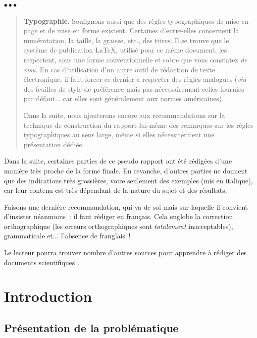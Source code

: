 \documentclass[11pt, french, screen, research-development]{report-rd-info}
\newenvironment{typographie}{\begin{quote}\textbf{Typographie}. }{\end{quote}}
\newenvironment{explanation}
{\color{blue}
 \begin{list}{}{\hspace{0.2\textwidth}\color{blue}}\item $\bullet\bullet\bullet$
}
{\end{list}}
\begin{document}
\begin{explanation}
   \begin{typographie}
   Soulignons aussi que des règles typographiques de mise en page et de mise en forme existent.
   Certaines d'entre-elles concernent la numérotation, la taille, la graisse, etc., des titres.
   Il se trouve que le système de publication \LaTeX, utilisé pour ce même document, les respectent, sous une forme conventionnelle et sobre que vous constatez \emph{de visu}.
   En cas d'utilisation d'un autre outil de rédaction de texte électronique, il faut forcer ce dernier à respecter des règles analogues (\emph{via} des feuilles de style de préférence mais pas nécessairement celles fournies par défaut...
   car elles sont généralement aux normes américaines).

   Dans la suite, nous ajouterons encore aux recommandations sur la technique de construction du rapport lui-même des remarques sur les règles typographiques au sens large, même si elles nécessiteraient une présentation dédiée.
   \end{typographie}

   \bigskip

   Dans la suite, certaines parties de ce pseudo rapport ont été rédigées d'une manière très proche de la forme finale.
   En revanche, d'autres parties ne donnent que des indications très grossières, voire seulement des exemples (mis en italique), car leur contenu est très dépendant de la nature du sujet et des résultats.

   \bigskip

   Faisons une dernière recommandation, qui va de soi mais sur laquelle il convient d'insister néanmoins~: il faut rédiger en français.
   Cela englobe la correction orthographique (les erreurs orthographiques sont \emph{totalement} inacceptables), grammaticale et... l'absence de franglais~!

   \bigskip

   Le lecteur pourra trouver nombre d'autres sources pour apprendre à rédiger des documents scientifiques \cite{Wolfe}.
\end{explanation}


\chapter{Introduction}

\section{Présentation de la problématique}
\end{document}
